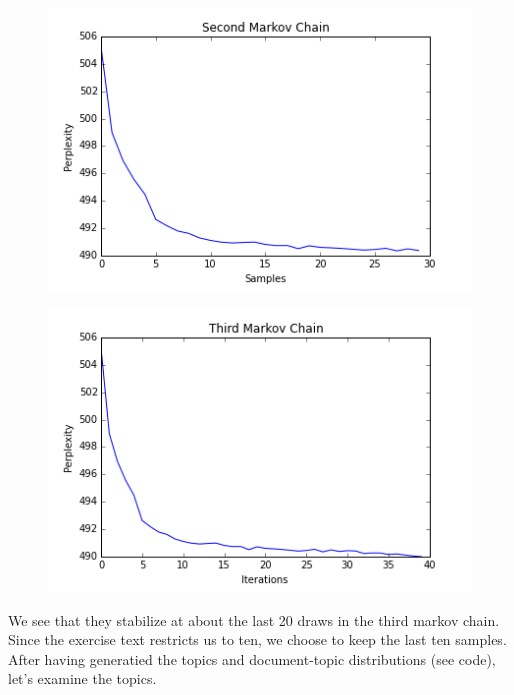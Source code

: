 \documentclass{article}
\begin{document}
\begin{figure}[H]
\centering
\includegraphics[width=120mm]{secondchain.png}
\end{figure}

\begin{figure}[H]
\centering
\includegraphics[width=120mm]{thirdchain.png}
\end{figure}

We see that they stabilize at about the last 20 draws in the third markov chain. Since the exercise text restricts us to ten, we choose to keep the last ten samples. 
After having generatied the topics and document-topic distributions (see code), let's examine the topics. 
\end{document}
